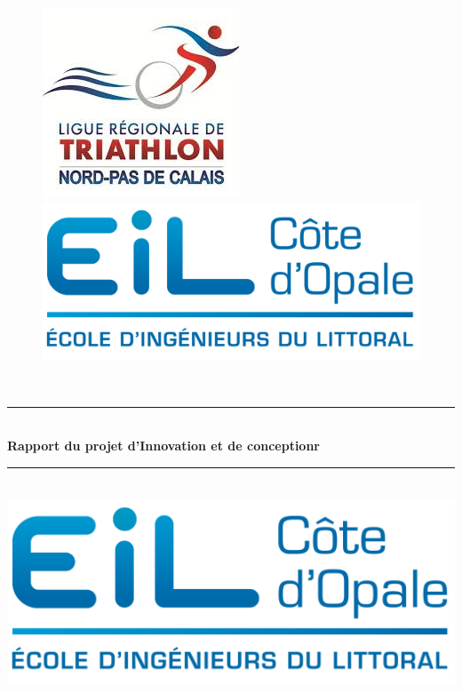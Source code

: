 \documentclass[12pt,a4paper]{report}
\newcommand{\HRule}{\rule{\linewidth}{0.5mm}}
\begin{document}
	

\begin{titlepage}
  \begin{sffamily}
  \begin{center}
\begin{figure}
\includegraphics[scale=0.8]{logo_png.png} \hfill
\includegraphics[scale=0.7]{eilco.png} 
\end{figure}


    \textsc{\Large }\\[1.5cm]

    \HRule \\[0.4cm]
    { \huge \bfseries Rapport du projet d'Innovation et de conceptionr\\[0.4cm] }

    \HRule \\[2cm]
    \includegraphics[scale=1]{logo.png}
    \\[2cm]


\end{center}
\end{sffamily}
\end{titlepage}
\end{document}
